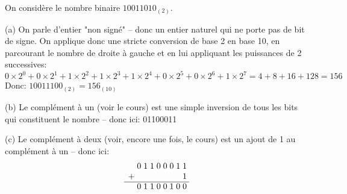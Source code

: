 \documentclass[11pt,a4paper]{exam}
\begin{document}
\begin{questions}
\begin{spacing}{1}
		
			On considère le nombre binaire $10011010_{(2)}$.
			
				           	\begin{solution}
				(a) On parle d'entier "non signé" -- donc un entier naturel qui ne porte pas de bit de signe. On applique donc une stricte conversion de base 2 en base 10, en parcourant le nombre de droite à gauche et en lui appliquant les puissances de 2 successives:
				\[ 0 \times 2^0 + 0 \times 2^1 + 1 \times 2^2 + 1 \times 2^3 + 1 \times 2^4 + 0 \times 2^5 + 0 \times 2^6 + 1 \times 2^7 = 4 + 8 + 16 + 128 = 156\]
				Donc: $10011100_{(2)} = 156_{(10)}$
				
				(b) Le complément à un (voir le cours) est une simple inversion de tous les bits qui constituent le nombre -- donc ici: 01100011
				
				(c) Le complément à deux (voir, encore une fois, le cours) est un ajout de 1 au complément à un -- donc ici:
					\[
				\begin{array}{r *{9}{@{\;}c}}
					& 0 & 1 & 1 & 0 & 0 & 0 & 1 & 1 \\
					+ &  &  &  &  &  &  &  & 1 \\
					\cline{1-9}
					& 0 & 1 & 1 & 0 & 0 & 1 & 0 & 0 \\
				\end{array}
				\]
				

\end{solution}
\end{spacing}
\end{questions}
\end{document}
